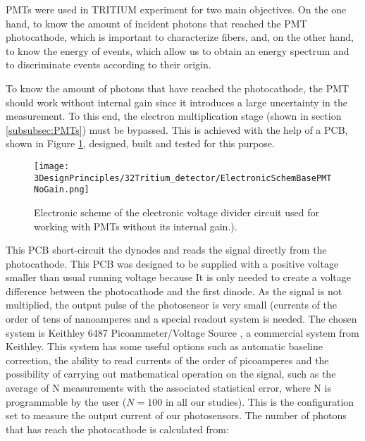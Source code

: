 PMTs were used in TRITIUM experiment for two main objectives. On the one hand, to know the amount of incident photons that reached the PMT photocathode, which is important to characterize fibers, and, on the other hand, to know the energy of events, which allow us to obtain an energy spectrum and to discriminate events according to their origin. %

To know the amount of photons that have reached the photocathode, the PMT should work without internal gain since it introduces a large uncertainty in the measurement. To this end, the electron multiplication stage (shown in section \ref{subsubsec:PMTs}) must be bypassed. This is achieved with the help of a PCB, shown in Figure \ref{fig:ElectronicSchemeBasePMTNoGain}, designed, built and tested for this purpose.  


\begin{figure}[htbp]
\centering
\texttt{[image: 3DesignPrinciples/32Tritium\_detector/ElectronicSchemBasePMTNoGain.png]}
\caption{Electronic scheme of the electronic voltage divider circuit used for working with PMTs without its internal gain.).\label{fig:ElectronicSchemeBasePMTNoGain}}
\end{figure}

This PCB short-circuit the dynodes and reads the signal directly from the photocathode. This PCB was designed to be supplied with a positive voltage smaller than usual running voltage because It is only needed to create a voltage difference between the photocathode and the first dinode. As the signal is not multiplied, the output pulse of the photosensor is very small (currents of the order of tens of nanoamperes and a special readout system is needed. The chosen system is Keithley 6487 Picoammeter/Voltage Source \cite{DataSheetKeithley6487}, a commercial system from Keithley. This system has some useful options such as automatic baseline correction, the ability to read currents of the order of picoamperes and the possibility of carrying out mathematical operation on the signal, such as the average of N measurements with the associated statistical error, where N is programmable by the user ($N=100$ in all our studies). This is the configuration set to measure the output current of our photosensors. The number of photons that has reach the photocathode is calculated from:

